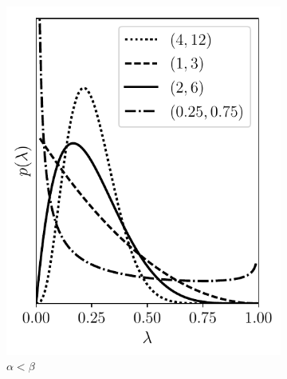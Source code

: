 \begin{figure}[t]
\begin{subfigure}{0.325\textwidth}
    \includegraphics[width=0.99\linewidth]{Chapters/02_LinearAlgebra/30_prob/python/beta2.pdf}
    \caption{$\alpha < \beta$}
    \label{fig:30_3b}
    \end{subfigure}
    \begin{subfigure}{0.325\textwidth}

\end{subfigure}
\end{figure}
